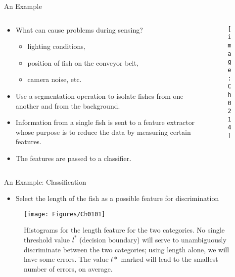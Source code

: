 \begin{frame}{An Example}
\begin{columns}
\begin{column}{6cm}
\begin{itemize}
\item What can cause problems during sensing?
\begin{itemize}
\item {\color{mycolor2}lighting conditions}, 
\item position of fish on the conveyor belt, 
\item camera noise, etc.
\end{itemize}
\item Use a segmentation operation to {\color{mycolor2}isolate fishes} from one another and from the {\color{mycolor2}background}.
\item Information from a single fish is sent to a {\color{mycolor1}feature extractor} whose purpose is to reduce the data by measuring certain features.
\item The features are passed to a classifier.
\end{itemize}
\end{column}
\begin{column}{5cm}
\begin{figure}
\texttt{[image: Ch0214]}
\end{figure}
\end{column}
\end{columns}
\end{frame}


\begin{frame}{An Example: Classification}
\begin{itemize}
\item Select the length of the fish as a possible feature for discrimination
\end{itemize}
\begin{figure}
\texttt{[image: Figures/Ch0101]}
\caption{Histograms for the length feature for the two categories. No single threshold value $l^*$ (decision boundary) will serve to unambiguously discriminate between the two categories; using length alone, we will have some errors. The value $l*$ marked will lead to the smallest number of errors, on average.}
\end{figure}
\end{frame}

